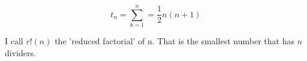\begin{equation}
	t_n = \sum_{k=1}^n = \frac{1}{2}n(n+1)
\end{equation}

I call $r!(n)$ the 'reduced factorial' of n. That is the smallest number that has $n$ dividers.
